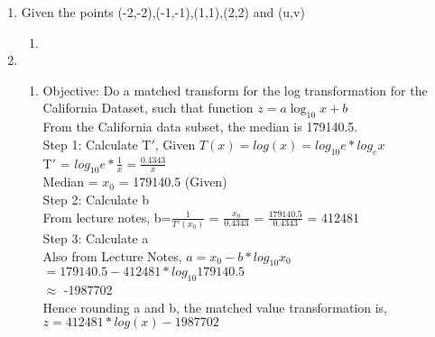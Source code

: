 \documentclass{article}
\begin{document}

\begin{enumerate}
\item Given the points (-2,-2),(-1,-1),(1,1),(2,2) and (u,v)
\begin{enumerate}
\item 
\end{enumerate}
\item 
\begin{enumerate}
\item Objective: Do a matched transform for the log transformation for the California Dataset, such that function $z=a\log_{10}{x}+b$
\\ From the California data subset, the median is 179140.5.
\\ Step 1: Calculate T$'$, Given $T(x)=log(x) = log_{10}e*log_{e}x$
\\ T$'$ = $log_{10}e*\frac{1}{x} = \frac{0.4343}{x}$
\\ Median = $x_0$ = 179140.5 (Given)
\\ Step 2: Calculate b
\\ From lecture notes, b=$\frac{1}{T'(x_0)}$ = $\frac{x_0}{0.4343}$ = $\frac{179140.5}{0.4343}$ = 412481
\\ Step 3: Calculate a
\\ Also from Lecture Notes, $a = x_0 - b*log_{10}x_0$ 
\\ $=179140.5-412481*log_{10}179140.5$
\\ $\approx$ -1987702
\\ Hence rounding a and b, the matched value transformation is, $z=412481*log(x)-1987702$
\end{enumerate}
\end{enumerate}
\end{document}
